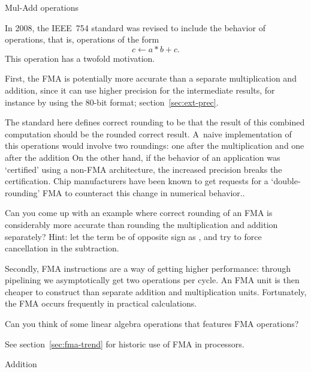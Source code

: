 
 {Mul-Add operations}

In 2008, the IEEE~754 standard was revised to include the behavior
of  operations, that is, operations of the
form \begin{equation}
  c \leftarrow a*b+c.
\end{equation}
This operation has a twofold motivation.

First, the \ac{FMA} is potentially more accurate than a separate
multiplication and addition, since it can use higher precision for the
intermediate results, for instance by using the 80-bit
 format;
section~\ref{sec:ext-prec}.

The standard here defines correct rounding to be that the result of
this combined computation should be the rounded correct
result. A~naive implementation of this operations would involve two
roundings: one after the multiplication and one after the
addition\footnoteenv
{On the other hand, if the behavior of an
  application was `certified' using a non-FMA architecture, the
  increased precision breaks the certification. Chip manufacturers
  have been known to get requests for a `double-rounding' FMA to
  counteract this change in numerical behavior.}.

\begin{exercise}
  Can you come up with an example where correct rounding of
  an \ac{FMA} is considerably more accurate than rounding the
  multiplication and addition separately? Hint: let the  term be
  of opposite sign as , and try to force cancellation in the
  subtraction.
\end{exercise}

Secondly, \ac{FMA} instructions are a way of getting higher
performance: through pipelining we asymptotically get two operations
per cycle. An \ac{FMA} unit is then cheaper to construct than separate
addition and multiplication units. Fortunately, the \ac{FMA} occurs
frequently in practical calculations.

\begin{exercise}
  Can you think of some linear algebra operations that features
  \ac{FMA} operations?
\end{exercise}

See section~\ref{sec:fma-trend} for historic use of \ac{FMA} in processors.

 {Addition}

